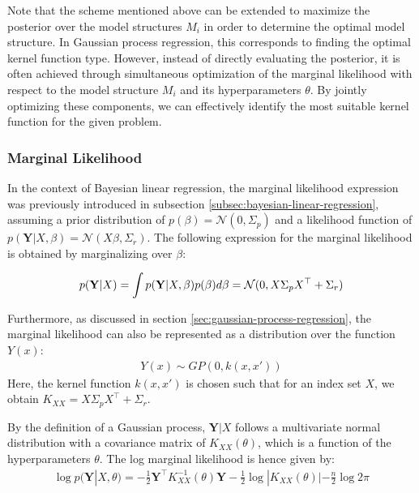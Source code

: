 Note that the scheme mentioned above can be extended to maximize the posterior over the model structures
$M_i$ in order to determine the optimal model structure.
In Gaussian process regression, this corresponds to finding the optimal kernel function type.
However, instead of directly evaluating the posterior, it is often achieved through simultaneous optimization of
the marginal likelihood with respect to the model structure $M_i$ and its hyperparameters $\theta$.
By jointly optimizing these components, we can effectively identify the most suitable kernel function for
the given problem.





\subsubsection{Marginal Likelihood}

In the context of Bayesian linear regression, the marginal likelihood expression was previously
introduced in subsection \ref{subsec:bayesian-linear-regression},
assuming a prior distribution of $p(\beta) = \mathcal{N}(0, \Sigma_p)$ and a likelihood function of
$p(\mathbf{Y} | X, \beta) = \mathcal{N}(X \beta, \Sigma_r)$.
The following expression for the marginal likelihood is obtained by marginalizing over $\beta$:

\begin{gather}\label{eq:marginal-likelihood2}
    p(\mathbf{Y}|X) = \int p(\mathbf{Y}|X,\beta) p(\beta) d\beta = \operatorname{\mathcal{N}}(0, X \Sigma_p X^{\top} + \Sigma_r)
\end{gather}

Furthermore, as discussed in section \ref{sec:gaussian-process-regression},
the marginal likelihood can also be represented as a distribution over the function $Y(x)$:
\begin{gather*}
    Y(x) \sim GP(0, k(x, x'))
\end{gather*}
Here, the kernel function $k(x, x')$ is chosen such that for an index set $X$,
we obtain $K_{XX} = X \Sigma_p X^{\top} + \Sigma_r$.

By the definition of a Gaussian process, $\mathbf{Y}|X$ follows a multivariate normal distribution
with a covariance matrix of $K_{XX}(\theta)$, which is a function of the hyperparameters $\theta$.
The log marginal likelihood is hence given by:
\begin{gather}\label{eq:gaussian-marginal-likelihood}
    \log p(\mathbf{Y} | X, \theta) = - \frac{1}{2} \mathbf{Y}^{\top} K_{XX}^{-1}(\theta) \mathbf{Y} -
    \frac{1}{2} \log |K_{XX}(\theta)| - \frac{n}{2} \log 2 \pi
\end{gather}

